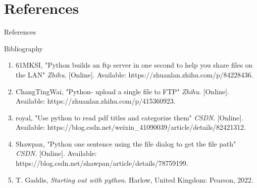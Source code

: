 \documentclass[a4paper,10pt]{beamer}
\begin{document}
\section{References}
\begin{frame}{References}
\begin{block}{Bibliography}
\begin{enumerate}
\item 61MKSI, "Python builds an ftp server in one second to help you share files on the LAN" \textit{Zhihu}. [Online]. Available: https://zhuanlan.zhihu.com/p/84228436. 
\item ChangTingWai, "Python- upload a single file to FTP" \textit{Zhihu}. [Online]. Available: https://zhuanlan.zhihu.com/p/415360923.
\item royal, "Use python to read pdf titles and categorize them" \textit{CSDN}. [Online]. Available: https://blog.csdn.net/weixin\_41090039/article/details/82421312.
\item Shawpan, "Python one sentence using the file dialog to get the file path" \textit{CSDN}. [Online]. Available: https://blog.csdn.net/shawpan/article/details/78759199. 
\item T. Gaddis, \textit{Starting out with python}. Harlow, United Kingdom: Pearson, 2022. 
\end{enumerate}
\end{block}
\end{frame}
\end{document}
